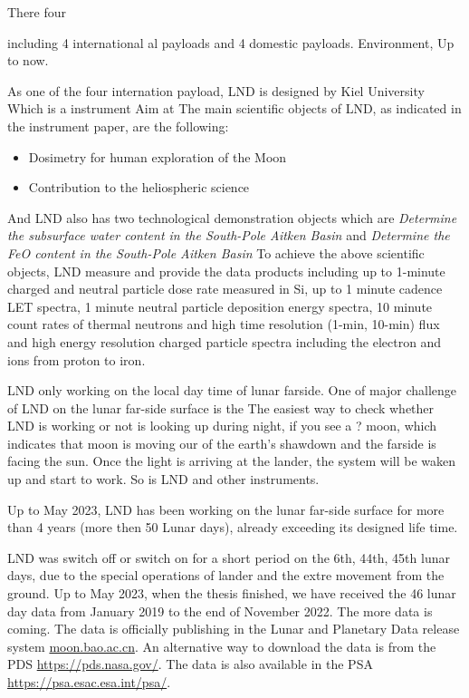 There four 


including 4 international     al payloads and 4 domestic payloads.
Environment, 
Up to now.

As one of the four internation payload, LND is designed by  Kiel University
Which is a  instrument 
Aim at 
The main scientific objects of LND, as indicated in the instrument paper, are the following:
\begin{itemize}
    \item Dosimetry for human exploration of the Moon
    \item Contribution to the heliospheric science
\end{itemize}
And LND also has two technological demonstration objects which are \textit{Determine the subsurface water content in the South-Pole Aitken Basin} and \textit{Determine the FeO content in the South-Pole Aitken Basin} 
To achieve the above scientific objects, LND measure and provide the data products including up to 1-minute charged and neutral particle dose rate measured in Si, up to 1 minute cadence LET spectra, 1 minute neutral particle deposition energy spectra, 10 minute count rates of thermal neutrons and high time resolution (1-min, 10-min) flux and high energy resolution charged particle spectra including the electron and ions from proton to iron.


LND only working on the local day time of lunar farside. One of major challenge of LND on the lunar far-side surface is the 
The easiest way to check whether LND is working or not is looking up during night, if you see a ? moon, which indicates that moon is moving our of the earth's shawdown and the farside is facing the sun. Once the light is arriving at the lander, the system will be waken up and start to work. So is LND and other instruments.

Up to May 2023, LND has been working on the lunar far-side surface for more than 4 years (more then 50 Lunar days), already exceeding its designed life time. 

LND was switch off or switch on for a short period on the 6th, 44th, 45th lunar days, due to the special operations of lander and the extre movement from the ground. Up to May 2023, when the thesis finished, we have received the 46 lunar day data from January 2019 to the end of November 2022. The more data is coming. 
The data is officially publishing in the Lunar and Planetary Data release system \url{moon.bao.ac.cn}. An alternative way to download the data is from the PDS \url{https://pds.nasa.gov/}. The data is also available in the \ac{PSA} \url{https://psa.esac.esa.int/psa/}.

